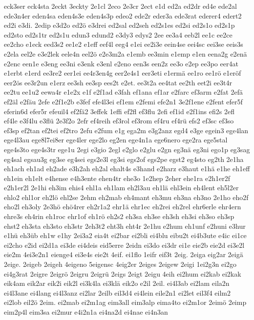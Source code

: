 {eck3ser
eck4sta
2eckt
3eckty
2e1cl
2eco
2e3cr
2ect
e1d
ed2a
ed2dr
ed4e
ede2al
ede3n4er
eden4sa
eden4s3e
eden4s3p
edeo2
ede2r
eder3a
ede3rat
ederer4
edert2
ed2i
e3di.
2edip
e3d2o
ed2ö
e3drei
ed2sal
ed2seh
ed2s1es
ed2si
ed2s1o
ed2s1p
ed2sto
ed2s1tr
ed2s1u
edun3
edund2
e3dy3
edys2
2ee
ee3a4
eeb2l
ee1c
ee2ce
ee2cho
e1eck
eed3s2
ee1e2
e1eff
eef4l
eeg4
e1ei
ee2i3e
eein4se
eei4sc
eei3se
eeis3s
e2ela
eel2e
e3e2lek
eele4n
eel2ö
e2e3m2a
e1emb
ee3min
e1emp
e1en
eena2g
e2enä
e2enc
een1e
e3eng
ee3ni
e3enk
e3enl
e2eno
een3s
een2z
ee3o
e2ep
ee3po
eer4at
e1erbt
e1erd
ee3re2
eer1ei
ee4r3en4g
eer2e4s1
eer3eti
e1ermä
ee1ro
ee1rö
e1eröf
eer2ös
ee3r2un
e1erz
ee3sh
ee3sp
ees2t
e2et.
ee3t2a
ee4tat
ee2th
eet2i
ee3t4r
ee2tu
ee1u2
eewa4r
e1e2x
e1f
e2f1ad
e3fah
ef1ana
ef1ar
e2farc
ef3arm
e2fat
2efä
ef2äl
e2fäu
2efe
e2f1e2b
e3fef
efe4l3ei
ef1em
e2femi
efe2n1
3e2f1ene
e2fent
efer5f
eferin6d
efer5r
efeuil4
ef2fä2
3effek
1effi
ef2fl
ef3flu
2efi
ef1id
e2f1ins
efi2s
2efl
ef4le
e3f4lu
e3flü
2e3f2o
2efr
ef4reih
ef3rol
ef3rom
ef4ru
ef4rü
efs2
ef3sc
ef3so
ef3sp
ef2tan
ef2tei
ef2tro
2efu
e2fum
e1g
ega2m
e3g2anz
egd4
e3ge
egein3
ege4lan
ege4l3au
ege8l7ei8er
ege4ler
ege2lo
eg2en
ege4n1a
ege6nero
ege2ra
ege5stal
ege4s3to
ege4s3tr
ege1u
2egi
e3gio
2egl
e2glo
e2glu
e2gn
eg3nä
eg3ni
ego1p
eg3sag
eg4sal
egsau3g
eg3se
eg4sei
egs2e3l
eg3si
egs2of
egs2pe
egst2
eg4sto
eg2th
2e1ha
eh1ach
eh1ad
eh2ade
e3h2ah
eh2al
ehalt4s
e3hand
e2harz
e3haut
e1hä
e1he
eh1eff
eh1ein
eh1elt
e4hense
e4h3ente
ehen4tr
ehe3o
1e2hep
2eher
ehe1ra
e2h1er2f
e2h1er2l
2e1hi
eh3im
ehis4
ehl1a
eh1lam
eh2l3au
eh1lä
ehl3ein
eh4lent
eh5l2er
ehlo2
ehl1or
eh2lö
ehl2se
2ehm
eh2mab
eh4mant
eh3mu
eh3na
eh3no
2e1ho
eho2f
eho2l
eh3oly
2e3hö
ehö4rer
eh2r1a2
ehr1ä
ehr1ec
eh2rei
eh2rel
ehr6erle
ehr4ern
ehre3s
eh4rin
eh1roc
ehr1of
eh1rö
eh2s2
eh3sa
eh3se
eh3sh
eh3si
eh3so
eh3sp
ehst2
eh3sta
eh3sto
eh3str
2eh3t2
eht3h
eht4r
2e1hu
e2hum
eh1unf
e2huni
e3hur
e1hü
eh3üb
eh1w
e1hy
2ei3a2
eia4t
ei2bar
ei2bli
ei4blu
eibu2t
ei4b3ute
e4ic
ei1ce
ei2cho
e2id
ei2d1a
ei3de
ei4deis
eid5erre
2eidn
ei3do
ei3dr
ei1e
eie2b
eie2d
ei3e2l
eie2m
4ei3e2n1
eienge4
ei3e4s
eie2t
4eif.
ei1flo
1eifr
eif3t
2eig.
2eiga
eig2ar
2eigä
2eige.
2eigeb
2eigeh
4eigeno
5eigensc
4eig2er
2eiges
2eigew
2eigi
1ei2g3n
ei2go
ei4g3rat
2eigre
2eigrö
2eigru
2eigrü
2eigs
2eigt
2eigu
4eih
ei2hum
ei2kab
ei2kak
eik4am
eik2ar
eik2i
eik2l
ei3k4la
ei3klä
eik2o
e2il
2eil.
ei4l3ab
ei2lam
eila2n
ei4l3ane
ei4lang
ei4l3anz
ei2lar
2eilb
eil3d4
ei4lein
eile2n1
ei2let
eil3f4
eilm2
ei2lob
eil2ö
2eim.
ei2mab
ei2m1ag
eim3all
eim3alp
eima4to
ei2m1or
2eimö
2eimp
eim2p4l
eim3sa
ei2mur
e4i2n1a
ei4na2d
ei4nae
ei4n3an
}
